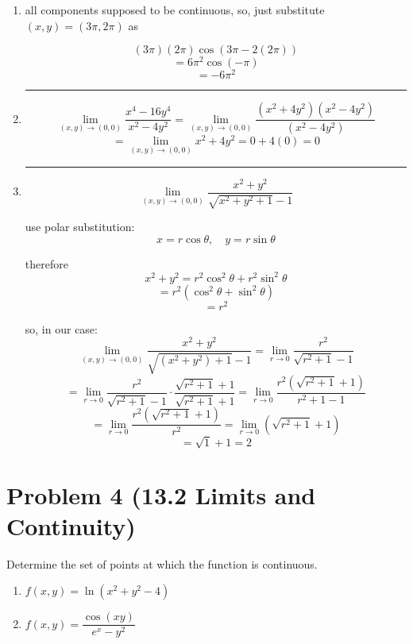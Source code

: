\documentclass{article}
\theoremstyle{remark}
\begin{document}
\begin{enumerate}[label=(\alph*)]
    \item all components supposed to be continuous, so, just substitute $(x,y) = (3\pi,2\pi)$ as
    
    \[
    (3\pi)(2\pi)\cos(3\pi - 2(2\pi))
    \]
    \[
    = 6\pi^2\cos(-\pi)
    \]
    \[
    = \boxed{-6\pi^2}
    \]

    \vspace{1em}

    \medskip
    \begin{center}
    \rule{0.3\linewidth}{0.2pt}
    \end{center}
    \medskip

    \item
    \[
    \lim_{(x,y)\to(0,0)} \frac{x^4-16y^4}{x^2-4y^2}
    = \lim_{(x,y)\to(0,0)} \frac{(x^2+4y^2)(x^2-4y^2)}{(x^2-4y^2)}
    \]
    \[
    = \lim_{(x,y)\to(0,0)} x^2+4y^2
    = 0 + 4(0)
    = \boxed{0}
    \]

    \medskip
    \begin{center}
    \rule{0.3\linewidth}{0.2pt}
    \end{center}
    \medskip

    \item
    \[
    \lim_{(x,y)\to(0,0)} \frac{x^2+y^2}{\sqrt{x^2+y^2+1}-1}
    \]

    use polar substitution:
    \[
    x=r\cos\theta,\quad y=r\sin\theta
    \]

    therefore
    \[
    x^2+y^2=r^2\cos^2\theta+r^2\sin^2\theta
    \]
    \[
    = r^2(\cos^2\theta+\sin^2\theta)
    \]
    \[
    = r^2
    \]

    so, in our case:
    \[
    \lim_{(x,y)\to(0,0)} \frac{x^2+y^2}{\sqrt{(x^2+y^2)+1}-1}
    = \lim_{r\to 0} \frac{r^2}{\sqrt{r^2+1}-1}
    \]
    \[
    = \lim_{r\to 0}\frac{r^2}{\sqrt{r^2+1}-1}\cdot \frac{\sqrt{r^2+1}+1}{\sqrt{r^2+1}+1}
    = \lim_{r\to 0}\frac{r^2(\sqrt{r^2+1}+1)}{r^2+1-1}
    \]
    \[
    = \lim_{r\to 0}\frac{r^2(\sqrt{r^2+1}+1)}{r^2}
    = \lim_{r\to 0}(\sqrt{r^2+1}+1)
    \]
    \[
    = \sqrt{1}+1=\boxed{2}
    \]
\end{enumerate}

\vspace{1em}
\hrulefill

\section*{Problem 4 (13.2 Limits and Continuity)}
Determine the set of points at which the function is continuous.
\begin{enumerate}[label=(\alph*)]
    \item $f(x, y) = \ln (x^2 + y^2 - 4)$
    \item $f(x, y) = \dfrac{\cos(xy)}{e^x-y^2}$
\end{enumerate}
\end{document}
